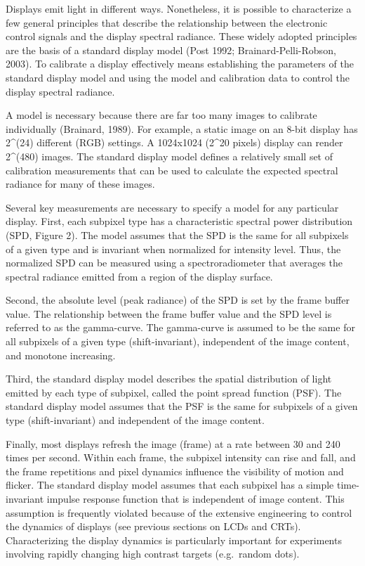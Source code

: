 \documentclass[
  letterpaper,
]{book}
\begin{document}
Displays emit light in different ways. Nonetheless, it is possible to
characterize a few general principles that describe the relationship
between the electronic control signals and the display spectral
radiance. These widely adopted principles are the basis of a standard
display model (Post 1992; Brainard-Pelli-Robson, 2003). To calibrate a
display effectively means establishing the parameters of the standard
display model and using the model and calibration data to control the
display spectral radiance.

A model is necessary because there are far too many images to calibrate
individually (Brainard, 1989). For example, a static image on an 8-bit
display has 2\^{}(24) different (RGB) settings. A 1024x1024 (2\^{}20
pixels) display can render 2\^{}(480) images. The standard display model
defines a relatively small set of calibration measurements that can be
used to calculate the expected spectral radiance for many of these
images.

Several key measurements are necessary to specify a model for any
particular display. First, each subpixel type has a characteristic
spectral power distribution (SPD, Figure 2). The model assumes that the
SPD is the same for all subpixels of a given type and is invariant when
normalized for intensity level. Thus, the normalized SPD can be measured
using a spectroradiometer that averages the spectral radiance emitted
from a region of the display surface.

Second, the absolute level (peak radiance) of the SPD is set by the
frame buffer value. The relationship between the frame buffer value and
the SPD level is referred to as the gamma-curve. The gamma-curve is
assumed to be the same for all subpixels of a given type
(shift-invariant), independent of the image content, and monotone
increasing.

Third, the standard display model describes the spatial distribution of
light emitted by each type of subpixel, called the point spread function
(PSF). The standard display model assumes that the PSF is the same for
subpixels of a given type (shift-invariant) and independent of the image
content.

Finally, most displays refresh the image (frame) at a rate between 30
and 240 times per second. Within each frame, the subpixel intensity can
rise and fall, and the frame repetitions and pixel dynamics influence
the visibility of motion and flicker. The standard display model assumes
that each subpixel has a simple time-invariant impulse response function
that is independent of image content. This assumption is frequently
violated because of the extensive engineering to control the dynamics of
displays (see previous sections on LCDs and CRTs). Characterizing the
display dynamics is particularly important for experiments involving
rapidly changing high contrast targets (e.g.~random dots).
\end{document}
